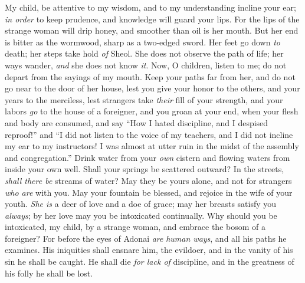 \begin{biblechapter} %
\verse My child, be attentive to my wisdom, 
and to my understanding incline your ear;
\verse \textit{in order} to keep prudence, 
and knowledge will guard your lips.
\verse For the lips of the strange woman will drip honey, 
and smoother than oil is her mouth.
\verse But her end is bitter as the wormwood, 
sharp as a two-edged sword.
\verse Her feet go down \textit{to} death; 
her steps take hold \textit{of} Sheol.
\verse She does not observe the path of life; 
her ways wander, \textit{and} she does not know \textit{it}.
 Now, O children, listen to me; 
do not depart from the sayings of my mouth.
\verse Keep your paths far from her, 
and do not go near to the door of her house,
\verse lest you give your honor to the others, 
and your years to the merciless,
\verse lest strangers take \textit{their} fill of your strength, 
and your labors \textit{go} to the house of a foreigner,
\verse and you groan at your end, 
when your flesh and body are consumed,
\verse and say “How I hated discipline, 
and I despised reproof!”
\verse and “I did not listen to the voice of my teachers, 
and I did not incline my ear to my instructors!
\verse I was almost at utter ruin 
in the midst of the assembly and congregation.”
\verse Drink water from your \textit{own} cistern 
and flowing waters from inside your own well.
\verse Shall your springs be scattered outward? 
In the streets, \textit{shall there be} streams of water?
\verse May they be yours alone, 
and not for strangers \textit{who are} with you.
\verse May your fountain be blessed, 
and rejoice in the wife of your youth.
\verse \textit{She is} a deer of love and a doe of grace; 
may her breasts satisfy you \textit{always}; 
by her love may you be intoxicated continually.
\verse Why should you be intoxicated, my child, by a strange woman, 
and embrace the bosom of a foreigner?
\verse For before the eyes of Adonai \textit{are} \textit{human ways}, 
and all his paths he examines.
\verse His iniquities shall ensnare him, the evildoer, 
and in the vanity of his sin he shall be caught.
\verse He shall die \textit{for lack of} discipline, 
and in the greatness of his folly he shall be lost.
\end{biblechapter}

